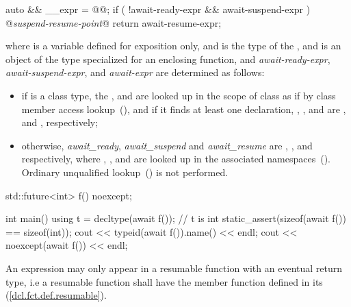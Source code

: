 \begin{codeblock}
{
  auto && __expr = @@;
  if ( !await-ready-expr && await-suspend-expr ) {
    @\textit{suspend-resume-point}@
  }
  return await-resume-expr;
}
\end{codeblock}

where  is a variable defined for
exposition only, and  is the type of the
, and 
is an object of the  type specialized for an enclosing function,
and \textit{await-ready-expr}, \textit{await-suspend-expr}, and \textit{await-expr} are
determined as follows:

\begin{itemize}
	\item if  is a class type, the 
	,  and  are 
	looked up in the scope of class 
	as if by class member access lookup~(), and if it finds at least one declaration, 
	, , and  are
	,  and ,
	respectively;
	
	\item otherwise, \textit{await_ready}, \textit{await_suspend} and \textit{await_resume} are 
	, , and  
	respectively, where 
	, , and  are 
	looked up in the associated namespaces~().
	\enternote Ordinary unqualified lookup~() is not
	performed. \exitnote
\end{itemize}


\pnum
 
\enterexample
\begin{codeblock}	
std::future<int> f() noexcept;
	
int main() {
  using t = decltype(await f()); // t is int
  static_assert(sizeof(await f()) == sizeof(int));
  cout << typeid(await f()).name() << endl;
  cout << noexcept(await f()) << endl;
}
\end{codeblock}
\exitexample%

\pnum
An  expression may only appear in a resumable function 
with an eventual return type, i.e a resumable function shall have the  member
function defined in its  (\ref{dcl.fct.def.resumable}).
